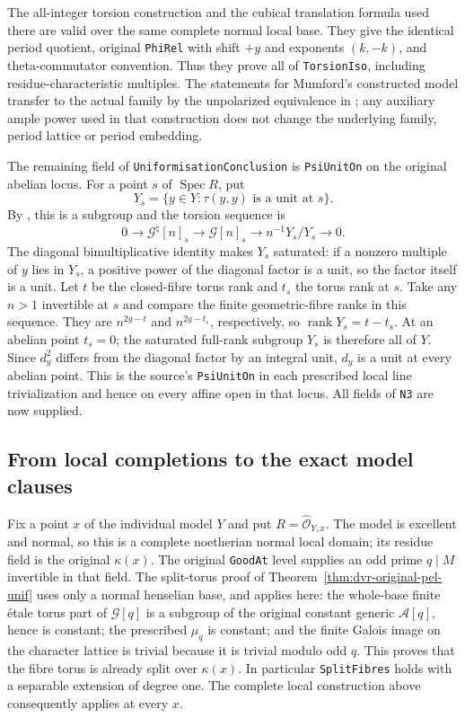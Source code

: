 The all-integer torsion construction and the cubical translation
formula used there are valid over the same complete normal local
base.  They give the identical period quotient, original
\texttt{PhiRel} with shift $+y$ and exponents $(k,-k)$, and
theta-commutator convention.  Thus they prove all of
\texttt{TorsionIso}, including residue-characteristic multiples.
The statements for Mumford's constructed model transfer to the
actual family by the unpolarized equivalence in
\cite[Theorem 4.4.16]{integral-theta-lan}; any auxiliary ample power
used in that construction does not change the underlying family,
period lattice or period embedding.

The remaining field of \texttt{UniformisationConclusion} is
\texttt{PsiUnitOn} on the original abelian locus.  For a point $s$
of $\operatorname{Spec}R$, put
\[
      Y_s=\{y\in Y:\tau(y,y)\text{ is a unit at }s\}.
\]
By \cite[Proposition 4.5.3.11 and Corollary 4.5.3.12]
{integral-theta-lan}, this is a subgroup and the torsion sequence is
\[
 0\longrightarrow\mathcal G^\natural[n]_s
  \longrightarrow\mathcal G[n]_s
  \longrightarrow n^{-1}Y_s/Y_s\longrightarrow0.
\]
The diagonal bimultiplicative identity makes $Y_s$ saturated:
if a nonzero multiple of $y$ lies in $Y_s$, a positive power of
the diagonal factor is a unit, so the factor itself is a unit.
Let $t$ be the closed-fibre torus rank and $t_s$ the torus rank
at $s$.  Take any $n>1$ invertible at $s$ and compare the finite
geometric-fibre ranks in this sequence.  They are
$n^{2g-t}$ and $n^{2g-t_s}$, respectively, so
$\operatorname{rank}Y_s=t-t_s$.  At an abelian point $t_s=0$;
the saturated full-rank subgroup $Y_s$ is therefore all of $Y$.
Since $d_y^2$ differs from the diagonal factor by an integral
unit, $d_y$ is a unit at every abelian point.  This is the
source's \texttt{PsiUnitOn} in each prescribed local line
trivialization and hence on every affine open in that locus.
All fields of \texttt{N3} are now supplied.

\subsection*{From local completions to the exact model clauses}

Fix a point $x$ of the individual model $Y$ and put
$R=\widehat{\mathcal O}_{Y,x}$.  The model is excellent and normal,
so this is a complete noetherian normal local domain; its residue
field is the original $\kappa(x)$.
The original \texttt{GoodAt} level supplies an odd prime
$q\mid M$ invertible in that field.  The split-torus proof of
Theorem~\ref{thm:dvr-original-pel-unif} uses only a normal
henselian base, and applies here: the whole-base finite \'etale
torus part of $\mathcal G[q]$ is a subgroup of the original
constant generic $\mathcal A[q]$, hence is constant; the prescribed
$\mu_q$ is constant; and the finite Galois image on the character
lattice is trivial because it is trivial modulo odd $q$.
This proves that the fibre torus is already split over
$\kappa(x)$.  In particular \texttt{SplitFibres} holds with a
separable extension of degree one.  The complete local construction
above consequently applies at every $x$.

